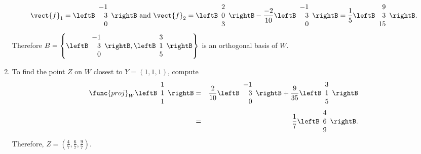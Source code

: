 \begin{solution}
\begin{enumerate}
\[ \vect{f}_1=\leftB\begin{array}{r} -1 \\ 3 \\ 0 \end{array}\rightB
\mbox{ and }
\vect{f}_2 =
\leftB\begin{array}{r} 2 \\ 0 \\ 3 \end{array}\rightB
-\frac{-2}{10}\leftB\begin{array}{r} -1 \\ 3 \\ 0 \end{array}\rightB
=\frac{1}{5}\leftB\begin{array}{r} 9 \\ 3 \\ 15 \end{array}\rightB.\]
Therefore
$B=\left\{ \leftB\begin{array}{r} -1 \\ 3 \\ 0 \end{array}\rightB,
\leftB\begin{array}{r} 3 \\ 1 \\ 5 \end{array}\rightB \right\}$ is
an orthogonal basis of $W$.
\item To find 
the point $Z$ on $W$ closest to $Y=(1,1,1)$, compute
\begin{eqnarray*}
\func{proj}_{W}\leftB\begin{array}{r} 1 \\ 1 \\ 1 \end{array}\rightB
& = &
\frac{2}{10} \leftB\begin{array}{r} -1 \\ 3 \\ 0 \end{array}\rightB
+ \frac{9}{35}\leftB\begin{array}{r} 3 \\ 1 \\ 5 \end{array}\rightB\\
& = & 
\frac{1}{7}\leftB\begin{array}{r} 4 \\ 6 \\ 9 \end{array}\rightB.
\end{eqnarray*}
Therefore, $Z=\left( \frac{4}{7}, \frac{6}{7}, \frac{9}{7}\right)$.
\end{enumerate}
\end{solution}
